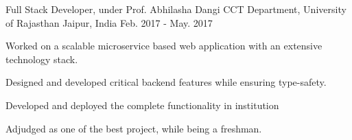 \begin{cventries}
  \cventry
  {Full Stack Developer, under Prof. Abhilasha Dangi}
  {CCT Department, University of Rajasthan}
  {Jaipur, India}
  {Feb. 2017 - May. 2017}
  {
    \begin{cvitems}
    \item Worked on a scalable microservice based web application with an extensive technology stack.
    \item Designed and developed critical backend features while
      ensuring type-safety.
    \item Developed and deployed the complete functionality in institution
    \item Adjudged as one of the best project, while being a freshman.
    \end{cvitems}
  }

\end{cventries}

